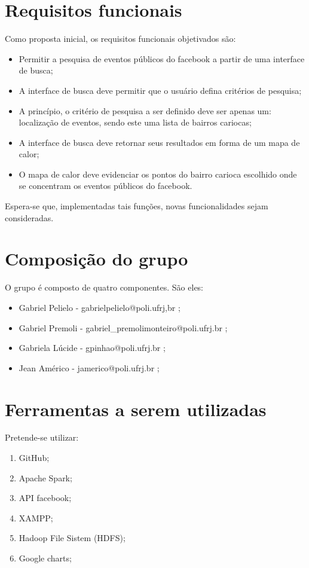 \documentclass[numbers,a4paper,12pt]{article}
\begin{document}
\section{Requisitos funcionais}

Como proposta inicial, os requisitos funcionais objetivados são: 

\begin{itemize}
\item Permitir a pesquisa de eventos públicos do facebook a partir de uma interface de busca;
\item A interface de busca deve permitir que o usuário defina critérios de pesquisa;
\item A princípio, o critério de pesquisa a ser definido deve ser apenas um: localização de eventos, sendo este uma lista de bairros cariocas;
\item A interface de busca deve retornar seus resultados em forma de um mapa de calor;
\item O mapa de calor deve evidenciar os pontos do bairro carioca escolhido onde se concentram os eventos públicos do facebook.
\end{itemize}

Espera-se que, implementadas tais funções, novas funcionalidades sejam consideradas.

\section{Composição do grupo}

O grupo é composto de quatro componentes. São eles:

\begin{itemize}
	\item Gabriel Pelielo - gabrielpelielo@poli.ufrj,br ;
	\item Gabriel Premoli - gabriel\_premolimonteiro@poli.ufrj.br ;
	\item Gabriela Lúcide - gpinhao@poli.ufrj.br ;
	\item Jean Américo - jamerico@poli.ufrj.br ;
\end{itemize}

\section{Ferramentas a serem utilizadas}

Pretende-se utilizar:

\begin{enumerate}
	\item GitHub;
	\item Apache Spark;
	\item API facebook;
	\item XAMPP;
	\item Hadoop File Sistem (HDFS);
	\item Google charts;
\end{enumerate}


%
%

\end{document}

